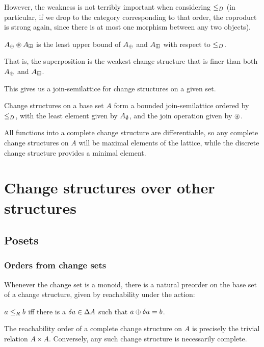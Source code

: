 However, the weakness is not terribly important when considering $\leq_D$
(in particular, if we drop to the category corresponding to that order, the
coproduct is strong again, since there is at most one morphism between any two
objects). 

\begin{corollary}
  $A_\oplus \circledast A_\boxplus$ is the least upper bound of $A_\oplus$ and $A_\boxplus$ with respect to $\leq_D$.
\end{corollary}

That is, the superposition is the weakest change structure that is finer than both
$A_\oplus$ and $A_\boxplus$.

This gives us a join-semilattice for change structures on a given set.

\begin{thm}
  Change structures on a base set $A$ form a bounded join-semilattice 
  ordered by $\leq_D$, with the least element given by
  $A_\emptyset$, and the join operation given by $\circledast$.
\end{thm}

All functions into a complete change structure are differentiable, so any
complete change structures on $A$ will be maximal elements of the lattice, while
the discrete change structure provides a minimal element.

\section{Change structures over other structures}
\label{sec:moreStructures}

\subsection{Posets}
\subsubsection{Orders from change sets}

Whenever the change set is a monoid, 
there is a natural preorder on the base set of a change structure, given by reachability
 under the action:
\begin{defn}
  $a \leq_R b$ iff there is a $\delta a \in \Delta A$ such that $a \oplus
  \delta a = b$.
\end{defn}

The reachability order of a complete change structure on $A$ is precisely the trivial relation
$A \times A$. Conversely, any such change structure is necessarily complete.

